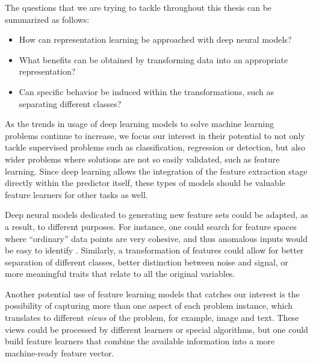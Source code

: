 The questions that we are trying to tackle throughout this thesis can be summarized as follows:

\begin{itemize}
    \item How can representation learning be approached with deep neural models?
    \item What benefits can be obtained by transforming data into an appropriate representation?
    \item Can specific behavior be induced within the transformations, such as separating different classes?
\end{itemize}



As the trends in usage of deep learning models to solve machine learning problems continue to increase, we focus our interest in their potential to not only tackle supervised problems such as classification, regression or detection, but also wider problems where solutions are not so easily validated, such as feature learning. Since deep learning allows the integration of the feature extraction stage directly within the predictor itself, these types of models should be valuable feature learners for other tasks as well.


Deep neural models dedicated to generating new feature sets could be adapted, as a result, to different purposes. For instance, one could search for feature spaces where ``ordinary'' data points are very cohesive, and thus anomalous inputs would be easy to identify . Similarly, a transformation of features could allow for better separation of different classes, better distinction between noise and signal, or more meaningful traits that relate to all the original variables.


Another potential use of feature learning models that catches our interest is the possibility of capturing more than one aspect of each problem instance, which translates to different \textit{views} of the problem, for example, image and text. These views could be processed by different learners or special algorithms, but one could build feature learners that combine the available information into a more machine-ready feature vector.

